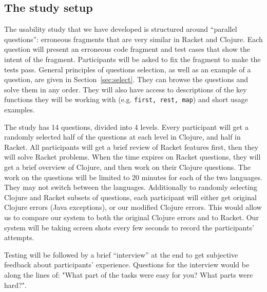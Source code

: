 \documentclass[submission,copyright,creativecommons]{eptcs}
\newcommand{\allcomments}[1]{{#1}}
\newcommand{\emcomment}[1]{{\bf \textcolor{ForestGreen}{\allcomments{{#1}}}}}
\newcommand{\thcomment}[1]{{\bf \textcolor{blue}{\allcomments{{#1}}}}}
\begin{document}
\subsection{The study setup}\label{sec:setup}

The usability study that we have developed is structured around ``parallel questions'': erroneous fragments that are very similar in 
Racket and Clojure. Each question will present an erroneous code fragment and test cases that show the intent of the fragment. 
Participants will be asked to fix the fragment to make the tests pass.
General principles of questions selection, as well as an example of a question, are given in Section~\ref{sec:select}.
 They can browse the questions and solve them in any order.
They will also have access to descriptions of the key functions they will be working with (e.g. {\tt first, rest, map}) and short
usage examples. 

The study has 14 questions, divided into 4 levels. 
Every participant will get a randomly selected half of the questions at each level in Clojure, and half in Racket. 
All participants will get a brief review of Racket features first, then they will solve Racket problems. When the time expires on Racket questions, 
they will get a brief overview of Clojure, and then work on their Clojure questions. 
The work on the questions will be limited to 20 minutes for each of the two languages. 
They may not switch between the languages. 
Additionally to randomly selecting Clojure and Racket subsets of questions, each participant will either get original Clojure
errors (Java exceptions), or our modified Clojure errors. 
This would allow us to compare our system to both the original Clojure errors and to Racket. 
Our system will be taking screen shots every few seconds to record the participants' attempts. 

Testing will be followed by a brief ``interview'' at the end to get subjective feedback about participants' experience. 
Questions for the interview would be along the lines of:  "What part of the tasks were easy for you? What parts were hard?".



	
	   
\end{document}
